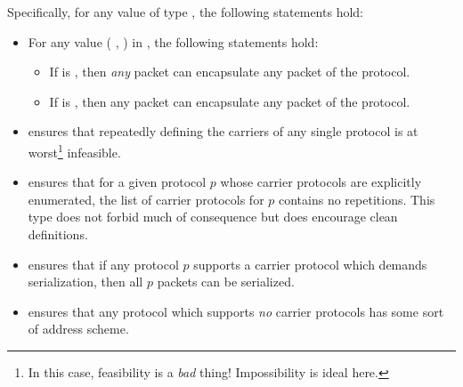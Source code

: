 \documentclass{report}
\begin{document}
\begin{itemize}
Specifically, for any value  of type  , the following statements hold:
\begin{itemize}
	\item For any value \AgdaSymbol( \AgdaSymbol , \AgdaSymbol) in  , the following statements hold:
	\begin{itemize}
		\item If  is , then \emph{any} packet can encapsulate any packet of the  protocol.
		\item If  is  , then any  packet can encapsulate any packet of the  protocol.
	\end{itemize}
	\item {}  ensures that repeatedly defining the carriers of any single protocol is at worst\footnote{In this case, feasibility is a \emph{bad} thing!  Impossibility is ideal here.} infeasible.
	\item {}  ensures that for a given protocol \(p\) whose carrier protocols are explicitly enumerated, the list of carrier protocols for \(p\) contains no repetitions.   This type does not forbid much of consequence but does encourage clean definitions.
	\item {}  ensures that if any protocol \(p\) supports a carrier protocol which demands serialization, then all \(p\) packets can be serialized.
	\item {}  ensures that any protocol which supports \emph{no} carrier protocols has some sort of address scheme.
\end{itemize}


\end{itemize}
\end{document}
